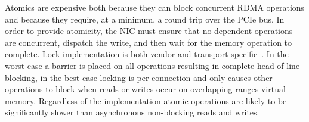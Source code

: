 Atomics are expensive both because they can block concurrent RDMA
operations and because they require, at a minimum, a round trip over
the PCIe bus.
In order to provide atomicity, the NIC must ensure
that no dependent operations are concurrent, dispatch the write, and
then wait for the memory operation to complete.
Lock implementation is both vendor and
transport specific~\cite{design-guidelines}. In the worst case a
barrier is placed on all operations resulting in complete head-of-line
blocking, in the best case locking is per connection and only causes
other operations to block when reads or writes occur on overlapping
ranges virtual memory. Regardless of the implementation atomic
operations are likely to be significantly slower than asynchronous non-blocking
reads and writes.





